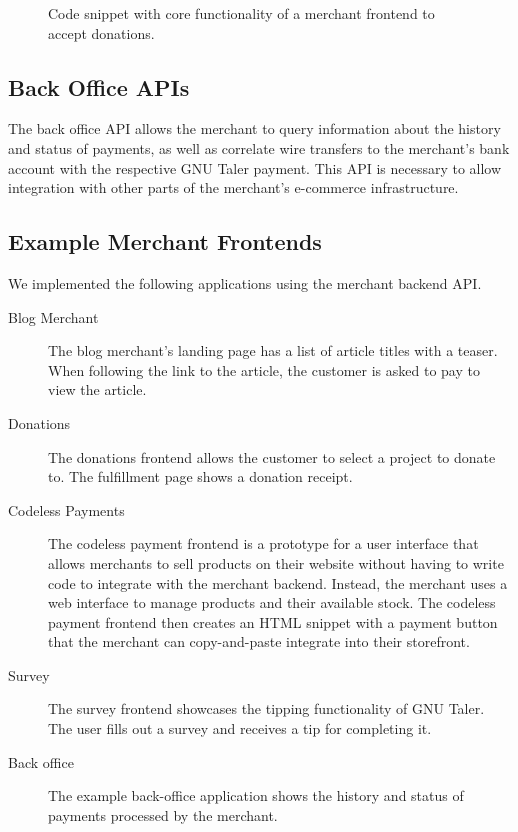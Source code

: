 \begin{figure}

\caption[Code snippet for merchant frontend]{Code snippet with core functionality of a merchant frontend to accept donations.}
\label{fig:merchant-donations-code}
\end{figure}


\subsection{Back Office APIs}

The back office API allows the merchant to query information about the history
and status of payments, as well as correlate wire transfers to the merchant's
bank account with the respective GNU Taler payment.  This API is necessary to
allow integration with other parts of the merchant's e-commerce infrastructure.


\subsection{Example Merchant Frontends}

We implemented the following applications using the merchant backend API.

\begin{description}
  \item[Blog Merchant] The blog merchant's landing page has a list of article titles with a teaser.
    When following the link to the article, the customer is asked to pay to view the article.
  \item[Donations]  The donations frontend allows the customer to select a project to donate to.
    The fulfillment page shows a donation receipt.
  \item[Codeless Payments]  The codeless payment frontend is a prototype for a
    user interface that allows merchants to sell products on their website
    without having to write code to integrate with the merchant backend.
    Instead, the merchant uses a web interface to manage products and their
    available stock.  The codeless payment frontend then creates an HTML snippet with a payment
    button that the merchant can copy-and-paste integrate into their storefront.
  \item[Survey]  The survey frontend showcases the tipping functionality of GNU Taler.
    The user fills out a survey and receives a tip for completing it.
  \item[Back office] The example back-office application shows the history and
    status of payments processed by the merchant.
\end{description}

